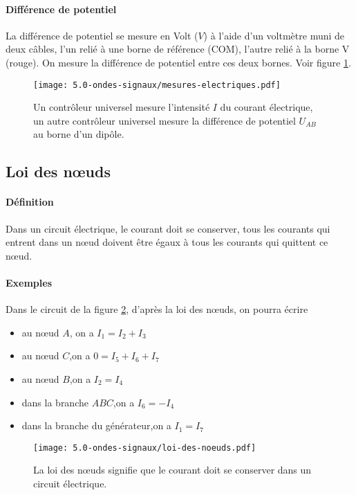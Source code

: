 \paragraph{Différence de potentiel} La différence de potentiel se mesure en Volt ($V$) à l'aide d'un voltmètre muni de deux câbles, l'un relié à une borne de référence (COM), l'autre relié à la borne V (rouge). On mesure la différence de potentiel entre ces deux bornes. Voir figure \ref{fig:mesures-electriques}.
\begin{figure}[h!]
  \begin{center}
      \texttt{[image: 5.0-ondes-signaux/mesures-electriques.pdf]}
  \end{center}
  \caption{Un contrôleur universel mesure l'intensité $I$ du courant électrique, un autre contrôleur universel mesure la différence de potentiel $U_{AB}$ au borne d'un dipôle.}
  \label{fig:mesures-electriques}
\end{figure}


\subsection{Loi des nœuds}
\paragraph{Définition} Dans un circuit électrique, le courant doit se conserver, tous les courants qui entrent dans un nœud doivent être égaux à tous les courants qui quittent ce nœud.
\paragraph{Exemples} Dans le circuit de la figure \ref{fig:loi-des-noeuds}, d'après la loi des nœuds, on pourra écrire 
\begin{itemize}
 \item au nœud $A$, on a $I_1 = I_2 + I_3$
 \item au nœud $C$,on a $0 = I_5 + I_6 + I_7$
 \item au nœud $B$,on a $I_2 = I_4$
 \item dans la branche $ABC$,on a $I_6 = - I_4$ 
 \item dans la branche du générateur,on a $I_1 = I_7$ 
\end{itemize}

\begin{figure}[h!]
  \begin{center}
      \texttt{[image: 5.0-ondes-signaux/loi-des-noeuds.pdf]}
  \end{center}
  \caption{La loi des nœuds signifie que le courant doit se conserver dans un circuit électrique.}
  \label{fig:loi-des-noeuds}
\end{figure}
